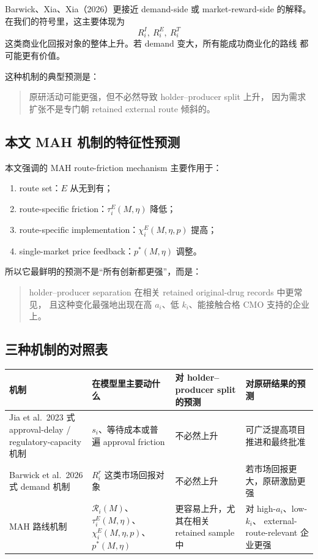 \documentclass[12pt,UTF8]{ctexart}
\newcommand{\Rset}{\mathcal{R}}
\theoremstyle{plain}
\theoremstyle{remark}
\begin{document}
Barwick、Xia、Xia（2026）更接近 demand-side 或 market-reward-side 的解释。
在我们的符号里，这主要体现为
\[
R_i^I,\ R_i^E,\ R_i^T
\]
这类商业化回报对象的整体上升。若 demand 变大，所有能成功商业化的路线
都可能更有价值。

这种机制的典型预测是：

\begin{quote}
原研活动可能更强，但不必然导致 holder--producer split 上升，
因为需求扩张不是专门朝 retained external route 倾斜的。
\end{quote}

\subsection{本文 MAH 机制的特征性预测}

本文强调的 MAH route-friction mechanism 主要作用于：

\begin{enumerate}[leftmargin=2em]
    \item route set：$E$ 从无到有；
    \item route-specific friction：$\tau_i^E(M,\eta)$ 降低；
    \item route-specific implementation：$\chi_i^E(M,\eta,p)$ 提高；
    \item single-market price feedback：$p^*(M,\eta)$ 调整。
\end{enumerate}

所以它最鲜明的预测不是“所有创新都更强”，而是：

\begin{quote}
holder--producer separation 在相关 retained original-drug records 中更常见，
且这种变化最强地出现在高 $a_i$、低 $k_i$、能接触合格 CMO 支持的企业上。
\end{quote}

\subsection{三种机制的对照表}

\begin{center}
\small
\begin{tabularx}{\textwidth}{>{\raggedright\arraybackslash}p{} >{\raggedright\arraybackslash}p{} >{\raggedright\arraybackslash}p{} X}
\toprule
机制 & 在模型里主要动什么 & 对 holder--producer split 的预测 & 对原研结果的预测 \\
\midrule
Jia et al.\ 2023 式 approval-delay /
regulatory-capacity 机制 &
$s_i$、等待成本或普遍 approval friction &
不必然上升 &
可广泛提高项目推进和最终批准 \\
Barwick et al.\ 2026 式 demand 机制 &
$R_i^r$ 这类市场回报对象 &
不必然上升 &
若市场回报更大，原研激励更强 \\
MAH 路线机制 &
$\Rset_i(M)$、$\tau_i^E(M,\eta)$、
$\chi_i^E(M,\eta,p)$、$p^*(M,\eta)$ &
更容易上升，尤其在相关 retained sample 中 &
对 high-$a_i$、low-$k_i$、
external-route-relevant 企业更强 \\
\bottomrule
\end{tabularx}
\end{center}
\end{document}
